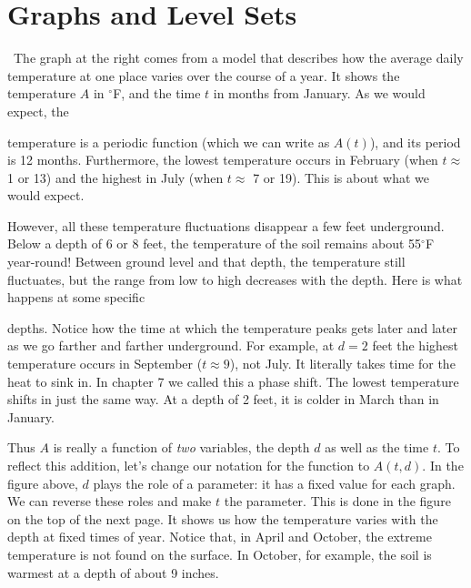 {{{{	
	
	
\section{Graphs and Level Sets}


\quad \ The graph at the right comes from a model that describes how the average daily temperature at one place varies over the course of a year.  It shows the temperature $A$ in $^\circ$F, and the time $t$ in months from January. \hfill As we would expect, the  

\noindent
temperature is a periodic function (which we can write as $A(t)$), and its period is 12 months.  Furthermore, the lowest temperature occurs in February (when $t \approx$ 1 or 13) and the highest in July (when $t \approx$ 7 or 19).  This is about what we would expect.

	However, all these temperature fluctuations disappear 
a few feet underground.  Below a depth of 6 or 8 feet, the temperature of the soil remains about 55$^\circ$F year-round!  Between ground level and that depth, the temperature still fluctuates, but the range from low to high decreases with the depth.  Here is what happens at some specific 
\linebreak
 

\vspace{166pt}
\label{timegraph}

\noindent
depths.  Notice how the time at which the temperature peaks gets later and later as we go farther and farther underground.  For example, at $d = 2$ feet the highest temperature occurs in September ($t \approx 9$), 
not July.  It literally takes time for the heat to sink in.  In chapter 7 we called this a phase shift.  The lowest temperature shifts in just the same way.  At a depth of 2 feet, it is colder in March than in January.   

	Thus $A$ is really a function of {\em two\/} variables, the depth $d$ as well as the time $t$.  To reflect this addition, let's change our notation for the function to $A(t, d)$.  In the figure above, $d$ plays the role of a parameter: it has a fixed value for each graph.  We can reverse these roles and make $t$ the parameter.  This is done in the figure on the top of the next page.  It shows us how the temperature 
varies with the depth at fixed times of year. Notice that, in April and October, the extreme temperature is not found on the surface.  In October, for example, the soil is warmest at a depth of about 9 inches.
	
}}}}
